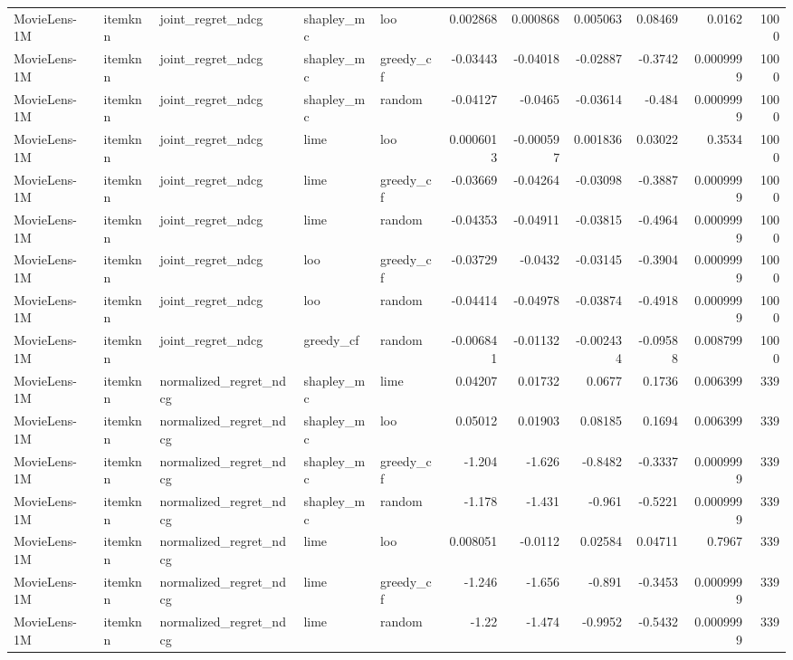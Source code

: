 \begin{table}[t]
\begin{tabular}{lllllrrrrrr}
MovieLens-1M & itemknn & joint\_regret\_ndcg & shapley\_mc & loo & 0.002868 & 0.000868 & 0.005063 & 0.08469 & 0.0162 & 1000 \\
MovieLens-1M & itemknn & joint\_regret\_ndcg & shapley\_mc & greedy\_cf & -0.03443 & -0.04018 & -0.02887 & -0.3742 & 0.0009999 & 1000 \\
MovieLens-1M & itemknn & joint\_regret\_ndcg & shapley\_mc & random & -0.04127 & -0.0465 & -0.03614 & -0.484 & 0.0009999 & 1000 \\
MovieLens-1M & itemknn & joint\_regret\_ndcg & lime & loo & 0.0006013 & -0.000597 & 0.001836 & 0.03022 & 0.3534 & 1000 \\
MovieLens-1M & itemknn & joint\_regret\_ndcg & lime & greedy\_cf & -0.03669 & -0.04264 & -0.03098 & -0.3887 & 0.0009999 & 1000 \\
MovieLens-1M & itemknn & joint\_regret\_ndcg & lime & random & -0.04353 & -0.04911 & -0.03815 & -0.4964 & 0.0009999 & 1000 \\
MovieLens-1M & itemknn & joint\_regret\_ndcg & loo & greedy\_cf & -0.03729 & -0.0432 & -0.03145 & -0.3904 & 0.0009999 & 1000 \\
MovieLens-1M & itemknn & joint\_regret\_ndcg & loo & random & -0.04414 & -0.04978 & -0.03874 & -0.4918 & 0.0009999 & 1000 \\
MovieLens-1M & itemknn & joint\_regret\_ndcg & greedy\_cf & random & -0.006841 & -0.01132 & -0.002434 & -0.09588 & 0.008799 & 1000 \\
MovieLens-1M & itemknn & normalized\_regret\_ndcg & shapley\_mc & lime & 0.04207 & 0.01732 & 0.0677 & 0.1736 & 0.006399 & 339 \\
MovieLens-1M & itemknn & normalized\_regret\_ndcg & shapley\_mc & loo & 0.05012 & 0.01903 & 0.08185 & 0.1694 & 0.006399 & 339 \\
MovieLens-1M & itemknn & normalized\_regret\_ndcg & shapley\_mc & greedy\_cf & -1.204 & -1.626 & -0.8482 & -0.3337 & 0.0009999 & 339 \\
MovieLens-1M & itemknn & normalized\_regret\_ndcg & shapley\_mc & random & -1.178 & -1.431 & -0.961 & -0.5221 & 0.0009999 & 339 \\
MovieLens-1M & itemknn & normalized\_regret\_ndcg & lime & loo & 0.008051 & -0.0112 & 0.02584 & 0.04711 & 0.7967 & 339 \\
MovieLens-1M & itemknn & normalized\_regret\_ndcg & lime & greedy\_cf & -1.246 & -1.656 & -0.891 & -0.3453 & 0.0009999 & 339 \\
MovieLens-1M & itemknn & normalized\_regret\_ndcg & lime & random & -1.22 & -1.474 & -0.9952 & -0.5432 & 0.0009999 & 339 \\

\end{tabular}
\end{table}
